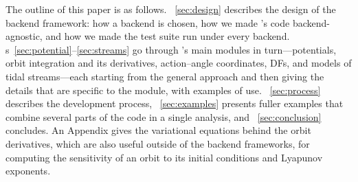 The outline of this paper is as follows. \sectionname~\ref{sec:design}
describes the design of the backend framework: how a backend is chosen,
how we made \galpy's code backend-agnostic, and how we made the test
suite run under every backend.
\sectionname s~\ref{sec:potential}--\ref{sec:streams} go through
\galpy's main modules in turn---potentials, orbit integration and its
derivatives, action--angle coordinates, DFs, and models of tidal
streams---each starting from the general approach and then giving the
details that are specific to the module, with examples of use.
\sectionname~\ref{sec:process} describes the development process,
\sectionname~\ref{sec:examples} presents fuller examples that combine
several parts of the code in a single analysis, and
\sectionname~\ref{sec:conclusion} concludes. An Appendix gives the
variational equations behind the orbit derivatives, which are also
useful outside of the backend frameworks, for computing the sensitivity
of an orbit to its initial conditions and Lyapunov exponents.
